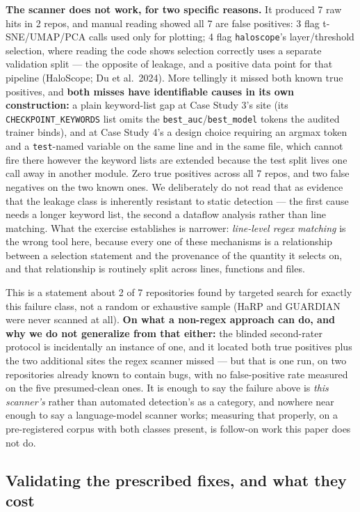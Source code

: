 \documentclass[10pt]{article} %
\begin{document}
\textbf{The scanner does not work, for two specific reasons.} It produced 7 raw
hits in 2 repos, and manual reading showed all 7 are false positives: 3 flag
t-SNE/UMAP/PCA calls used only for plotting; 4 flag \texttt{haloscope}'s
layer/threshold selection, where reading the code shows selection correctly
uses a separate validation split --- the opposite of leakage, and a positive
data point for that pipeline (HaloScope; Du et al.\ 2024). More tellingly it
missed both known true positives, and \textbf{both misses have identifiable
causes in its own construction:} a plain keyword-list gap at Case Study 3's
site (its \texttt{CHECKPOINT\_KEYWORDS} list omits the
\texttt{best\_auc}/\texttt{best\_model} tokens the audited trainer binds), and
at Case Study 4's a design choice requiring an argmax token and a
\texttt{test}-named variable on the same line and in the same file, which
cannot fire there however the keyword lists are extended because the test split
lives one call away in another module. Zero true positives across all 7 repos,
and two false negatives on the two known ones. We
deliberately do not read that as evidence that the leakage class is inherently
resistant to static detection --- the first cause needs a longer keyword list,
the second a dataflow analysis rather than line matching. What the exercise
establishes is narrower: \emph{line-level regex matching} is the wrong tool
here, because every one of these mechanisms is a relationship between a
selection statement and the provenance of the quantity it selects on, and that
relationship is routinely split across lines, functions and files.

This is a statement about 2 of 7 repositories found by targeted search for
exactly this failure class, not a random or exhaustive sample (HaRP and
GUARDIAN were never scanned at all). \textbf{On what a non-regex approach can
do, and why we do not generalize from that either:} the blinded second-rater
protocol is incidentally an instance of one, and it located both true
positives plus the two additional sites the regex scanner missed --- but that
is one run, on two repositories already known to contain bugs, with no
false-positive rate measured on the five presumed-clean ones. It is enough to
say the failure above is \emph{this scanner's} rather than automated
detection's as a category, and nowhere near enough to say a language-model
scanner works; measuring that properly, on a pre-registered corpus with both
classes present, is follow-on work this paper does not do.

\subsection{Validating the prescribed fixes, and what they cost}
\label{sec:validate-fixes}
\end{document}
